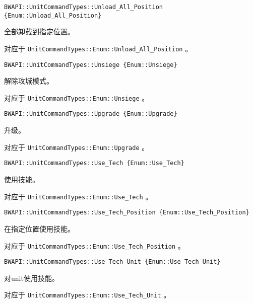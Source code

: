 \begin{tcolorbox}[colback=white, colframe=black!60!white, title=Unload\_All\_Position\{\}, arc=0mm]
\begin{verbatim}
BWAPI::UnitCommandTypes::Unload_All_Position {Enum::Unload_All_Position}
\end{verbatim}
全部卸载到指定位置。\par 对应于   \verb|UnitCommandTypes::Enum::Unload_All_Position|  。
\end{tcolorbox}


\begin{tcolorbox}[colback=white, colframe=black!60!white, title=Unsiege\{\}, arc=0mm]
\begin{verbatim}
BWAPI::UnitCommandTypes::Unsiege {Enum::Unsiege}
\end{verbatim}
解除攻城模式。\par 对应于   \verb|UnitCommandTypes::Enum::Unsiege|  。
\end{tcolorbox}


\begin{tcolorbox}[colback=white, colframe=black!60!white, title=Upgrade\{\}, arc=0mm]
\begin{verbatim}
BWAPI::UnitCommandTypes::Upgrade {Enum::Upgrade}
\end{verbatim}
升级。\par 对应于   \verb|UnitCommandTypes::Enum::Upgrade|  。
\end{tcolorbox}


\begin{tcolorbox}[colback=white, colframe=black!60!white, title=Use\_Tech\{\}, arc=0mm]
\begin{verbatim}
BWAPI::UnitCommandTypes::Use_Tech {Enum::Use_Tech}
\end{verbatim}
使用技能。\par 对应于   \verb|UnitCommandTypes::Enum::Use_Tech|  。
\end{tcolorbox}


\begin{tcolorbox}[colback=white, colframe=black!60!white, title=Use\_Tech\_Position\{\}, arc=0mm]
\begin{verbatim}
BWAPI::UnitCommandTypes::Use_Tech_Position {Enum::Use_Tech_Position}
\end{verbatim}
在指定位置使用技能。\par 对应于   \verb|UnitCommandTypes::Enum::Use_Tech_Position|  。
\end{tcolorbox}


\begin{tcolorbox}[colback=white, colframe=black!60!white, title=Use\_Tech\_Unit\{\}, arc=0mm]
\begin{verbatim}
BWAPI::UnitCommandTypes::Use_Tech_Unit {Enum::Use_Tech_Unit}
\end{verbatim}
对unit使用技能。\par 对应于   \verb|UnitCommandTypes::Enum::Use_Tech_Unit|  。
\end{tcolorbox}